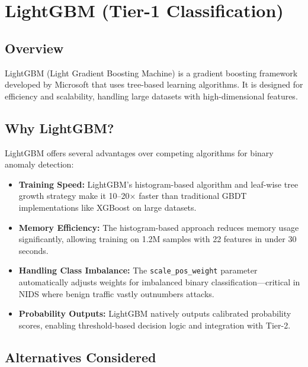 \documentclass[12pt,a4paper,twoside]{report}
\begin{document}
\section{LightGBM (Tier-1 Classification)}

\subsection{Overview}

LightGBM (Light Gradient Boosting Machine) is a gradient boosting framework developed by Microsoft that uses tree-based learning algorithms. It is designed for efficiency and scalability, handling large datasets with high-dimensional features.

\subsection{Why LightGBM?}

LightGBM offers several advantages over competing algorithms for binary anomaly detection:

\begin{itemize}
    \item \textbf{Training Speed:} LightGBM's histogram-based algorithm and leaf-wise tree growth strategy make it 10--20× faster than traditional GBDT implementations like XGBoost on large datasets.
    \item \textbf{Memory Efficiency:} The histogram-based approach reduces memory usage significantly, allowing training on 1.2M samples with 22 features in under 30 seconds.
    \item \textbf{Handling Class Imbalance:} The \texttt{scale\_pos\_weight} parameter automatically adjusts weights for imbalanced binary classification—critical in NIDS where benign traffic vastly outnumbers attacks.
    \item \textbf{Probability Outputs:} LightGBM natively outputs calibrated probability scores, enabling threshold-based decision logic and integration with Tier-2.
\end{itemize}

\subsection{Alternatives Considered}
\end{document}
